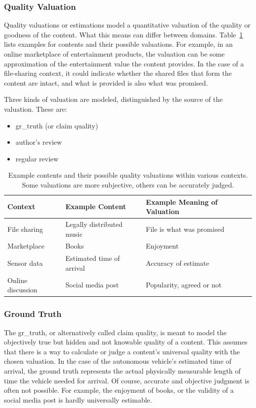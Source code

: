 \documentclass[%
    ]{\PathToTumTemplate/thesis/tum_thesis}
\begin{document}
\subsubsection{Quality Valuation}
Quality valuations or estimations model a quantitative valuation of the quality or goodness of the content.
What this means can differ between domains.
Table~\ref{tab:content_examples} lists examples for contents and their possible valuations.
For example, in an online marketplace of entertainment products, the valuation can be some approximation of the entertainment value the content provides.
In the case of a file-sharing context, it could indicate whether the shared files that form the content are intact, and what is provided is also what was promised.

Three kinds of valuation are modeled, distinguished by the source of the valuation. These are:
\begin{itemize}
	\item \gls{gr_truth} (or claim quality)
	\item author's review
	\item regular review
\end{itemize}


\begin{table}[tbp]
\centering
\begin{tabular}{lll}
\toprule
\textbf{Context}        & \textbf{Example Content} & \textbf{Example Meaning of Valuation} \\ \midrule
File sharing       & Legally distributed music & File is what was promised \\
Marketplace        & Books & Enjoyment \\
Sensor data     & Estimated time of arrival & Accuracy of estimate \\
Online discussion   & Social media post & Popularity, agreed or not \\
\bottomrule
\end{tabular}
\caption{
	Example contents and their possible quality valuations within various contexts.
	Some valuations are more subjective, others can be accurately judged.
}
\label{tab:content_examples}
\end{table}

\subsubsection{Ground Truth}\label{sec:approach_gr_truth}
The \gls{gr_truth}, or alternatively called claim quality, is meant to model the objectively true but hidden and not knowable quality of a content.
This assumes that there is a way to calculate or judge a content's universal quality with the chosen valuation.
In the case of the autonomous vehicle's estimated time of arrival, the ground truth represents the actual physically measurable length of time the vehicle needed for arrival.
Of course, accurate and objective judgment is often not possible.
For example, the enjoyment of books, or the validity of a social media post is hardly universally estimable.
\end{document}
